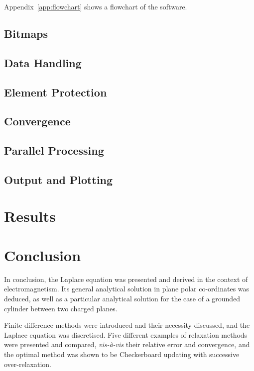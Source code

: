 \documentclass[11pt, a4paper]{article}
\begin{document}
Appendix~\ref{app:flowchart} shows a flowchart of the software.

\subsection{Bitmaps}


\subsection{Data Handling}


\subsection{Element Protection}
\label{sec:mask}


\subsection{Convergence}


\subsection{Parallel Processing}


\subsection{Output and Plotting}


\section{Results}


\section{Conclusion}
In conclusion, the Laplace equation was presented and derived in the context of
electromagnetism. Its general analytical solution in plane polar co-ordinates was
deduced, as well as a particular analytical solution for the case of a grounded
cylinder between two charged planes.

Finite difference methods were introduced and their necessity discussed, and the
Laplace equation was discretised. Five different examples of relaxation methods were
presented and compared, \emph{vis-\`{a}-vis} their relative error and convergence, and
the optimal method was shown to be Checkerboard updating with successive over-relaxation.
\end{document}

